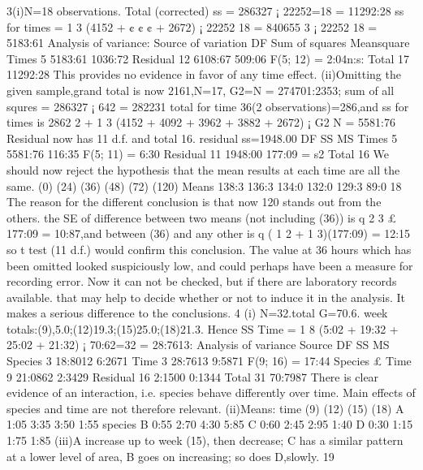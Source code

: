 3(i)N=18 observations. Total (corrected) ss = 286327 ¡ 22252=18 = 11292:28
ss for times =
1
3
(4152 + ¢ ¢ ¢ + 2672) ¡
22252
18
=
840655
3
¡
22252
18
= 5183:61
Analysis of variance:
Source of variation DF Sum of squares Meansquare
Times 5 5183:61 1036:72
Residual 12 6108:67 509:06 F(5; 12) = 2:04n:s:
Total 17 11292:28
This provides no evidence in favor of any time effect.
(ii)Omitting the given sample,grand total is now 2161,N=17, G2=N = 274701:2353;
sum of all squres = 286327 ¡ 642 = 282231 total for time 36(2 observations)=286,and
ss for times is
2862
2
+
1
3
(4152 + 4092 + 3962 + 3882 + 2672) ¡
G2
N
= 5581:76
Residual now has 11 d.f. and total 16. residual ss=1948.00
DF SS MS
Times 5 5581:76 116:35 F(5; 11) = 6:30
Residual 11 1948:00 177:09 = s2
Total 16
We should now reject the hypothesis that the mean results at each time are all the same.
(0) (24) (36) (48) (72) (120)
Means 138:3 136:3 134:0 132:0 129:3 89:0
18
The reason for the different conclusion is that now 120 stands out from the others.
the SE of difference between two means (not including (36)) is
q
2
3 £ 177:09 = 10:87,and
between (36) and any other is
q
( 1
2 + 1
3)(177:09) = 12:15 so t test (11 d.f.) would confirm
this conclusion.
The value at 36 hours which has been omitted looked suspiciously low, and could perhaps
have been a measure for recording error. Now it can not be checked, but if there
are laboratory records available. that may help to decide whether or not to induce it in
the analysis. It makes a serious difference to the conclusions.
4 (i) N=32.total G=70.6. week totals:(9),5.0;(12)19.3;(15)25.0;(18)21.3. Hence
SS Time =
1
8
(5:02 + 19:32 + 25:02 + 21:32) ¡ 70:62=32 = 28:7613:
Analysis of variance
Source DF SS MS
Species 3 18:8012 6:2671
Time 3 28:7613 9:5871 F(9; 16) = 17:44
Species £ Time 9 21:0862 2:3429
Residual 16 2:1500 0:1344
Total 31 70:7987
There is clear evidence of an interaction, i.e. species behave differently over time.
Main effects of species and time are not therefore relevant.
(ii)Means:
time (9) (12) (15) (18)
A 1:05 3:35 3:50 1:55
species B 0:55 2:70 4:30 5:85
C 0:60 2:45 2:95 1:40
D 0:30 1:15 1:75 1:85
(iii)A increase up to week (15), then decrease; C has a similar pattern at a lower
level of area, B goes on increasing; so does D,slowly.
19
